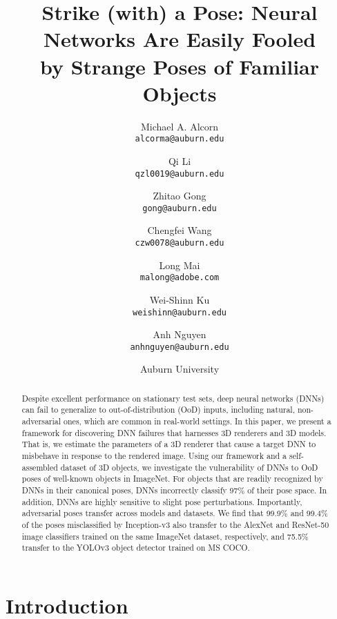 \documentclass[10pt,twocolumn,letterpaper]{article}
\begin{document}
\newcommand{\papertitle}{Strike (with) a Pose: Neural Networks Are Easily Fooled \\by Strange Poses of Familiar Objects}
\title{\papertitle}


\author{Michael A. Alcorn\\
{\tt\small alcorma@auburn.edu}
\and
Qi Li\\
{\tt\small qzl0019@auburn.edu}
\and
Zhitao Gong\\
{\tt\small gong@auburn.edu}
\and
Chengfei Wang\\
{\tt\small czw0078@auburn.edu}
\and
Long Mai\\
{\tt\small malong@adobe.com}
\and
Wei-Shinn Ku\\
{\tt\small weishinn@auburn.edu}
\and
Anh Nguyen\\
{\tt\small anhnguyen@auburn.edu}
\and
{Auburn University}\hspace{1cm}{Adobe Inc.~~~~~~~}
}

\maketitle

\begin{abstract}

Despite excellent performance on stationary test sets, deep neural networks (DNNs) can fail to generalize to out-of-distribution (OoD) inputs, including natural, non-adversarial ones, which are common in real-world settings.
In this paper, we present a framework for discovering DNN failures that harnesses 3D renderers and 3D models.
That is, we estimate the parameters of a 3D renderer that cause a target DNN to misbehave in response to the rendered image.
Using our framework and a self-assembled dataset of 3D objects, we investigate the vulnerability of DNNs to OoD poses of well-known objects in ImageNet.
For objects that are readily recognized by DNNs in their canonical poses, DNNs incorrectly classify 97\% of their pose space.
In addition, DNNs are highly sensitive to slight pose perturbations.
Importantly, adversarial poses transfer across models and datasets.
We find that 99.9\% and 99.4\% of the poses misclassified by Inception-v3 also transfer to the AlexNet and ResNet-50 image classifiers trained on the same ImageNet dataset, respectively, and 75.5\% transfer to the YOLOv3 object detector trained on MS COCO.

	
\end{abstract}


\section{Introduction}
\end{document}
